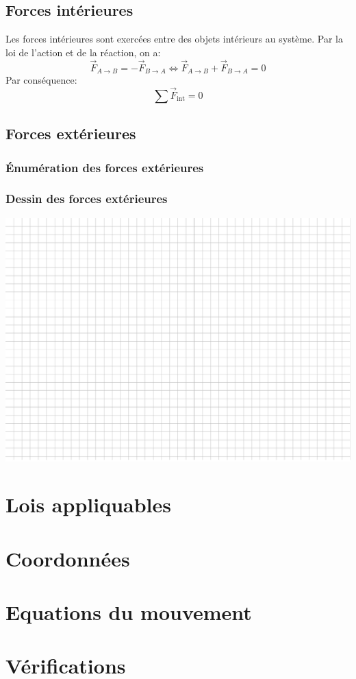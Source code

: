 \documentclass[14pt]{extreport}
\begin{document}
\subsection*{Forces intérieures}
Les forces intérieures sont exercées entre des objets intérieurs
au système. Par la loi de l'action et de la réaction, on a:
\[ \vec{F}_{A \rightarrow B} = -\vec{F}_{B \rightarrow A}
\Longleftrightarrow \vec{F}_{A \rightarrow B} +
\vec{F}_{B \rightarrow A} = 0 \]
Par conséquence:
\[ \sum \vec{F}_{\mathrm{int}} = 0 \]

\subsection*{Forces extérieures}


\subsubsection*{Énumération des forces extérieures}


\subsubsection*{Dessin des forces extérieures}
\includegraphics[width=\textwidth]{test_xournalpp.pdf}


\section*{Lois appliquables}


\section*{Coordonnées}


\section*{Equations du mouvement}


\section*{Vérifications}
\end{document}
